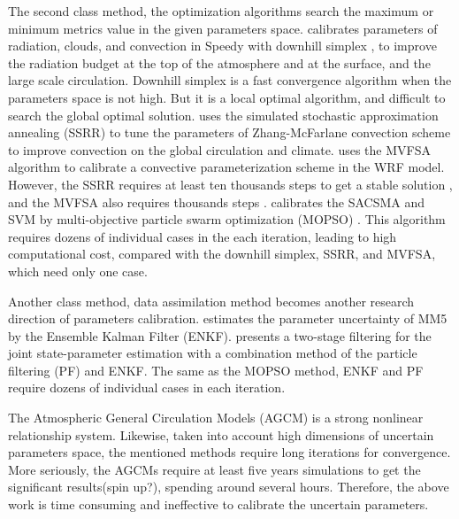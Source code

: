 \documentclass[gmd, manuscript]{copernicus}
\begin{document}
The second class method, the optimization algorithms search the maximum or minimum metrics value in the given parameters space. \cite{severijns2005optimizing} calibrates parameters of radiation,  clouds, and convection in Speedy with downhill simplex \citep{press1992numerical,nelder1965simplex}, to improve the radiation budget at the top of the atmosphere and at the surface, and the  large scale circulation. Downhill simplex is a fast convergence algorithm when the parameters space is not high. But it is a local optimal algorithm, and difficult to search the global optimal solution.\cite{yang2013uncertainty} uses the  simulated stochastic approximation annealing (SSRR) \citep{liang2013simulated}  to tune the parameters of Zhang-McFarlane convection scheme to improve convection on the global circulation and climate. \cite{yang2014calibration}  uses the MVFSA algorithm to calibrate a convective parameterization scheme in the WRF model. However, the SSRR requires at least ten thousands steps to get a stable solution \citep{liang2013simulated}, and the MVFSA also requires thousands steps \citep{jackson2004efficient}. 	\cite{gill2006multiobjective} calibrates the SACSMA and SVM by multi-objective particle swarm optimization (MOPSO) . This algorithm requires dozens of individual cases in the each iteration, leading to high computational cost, compared with the downhill simplex, SSRR, and MVFSA, which need only one case. 

Another class method, data assimilation method becomes another research direction of parameters calibration. \cite{aksoy2006ensemble} estimates the parameter uncertainty of MM5 by the Ensemble Kalman Filter (ENKF). \cite{santiti2013simulated} presents a two-stage filtering for the joint state-parameter estimation with a combination method of the particle filtering (PF) and ENKF.  The same as the MOPSO method, ENKF and PF require  dozens of individual cases in each iteration. 

The Atmospheric General Circulation Models (AGCM) is a strong nonlinear relationship system. Likewise, taken into account high dimensions of uncertain parameters space, the mentioned methods require long iterations for convergence. More seriously, the AGCMs require at least five years simulations to get the significant results(spin up?), spending around several hours. Therefore, the above work  is  time consuming and ineffective to calibrate the uncertain parameters. 
\end{document}
